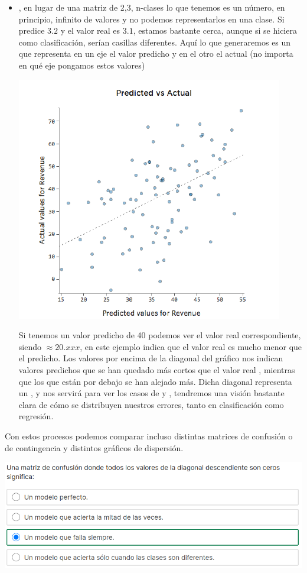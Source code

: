 \begin{itemize}
    \item {}, en lugar de una matriz de 2,3, n-clases lo que tenemos es un número, en principio, infinito de valores y no podemos representarlos en una clase. Si predice $3.2$ y el valor real es $3.1$,  estamos bastante cerca, aunque si se hiciera como clasificación, serían casillas diferentes. Aquí lo que generaremos es un  que representa en un eje el valor predicho y en el otro el actual (no importa en qué eje pongamos estos valores)
    \begin{center}
        \includegraphics[scale=.67]{images/mod02-10.png}
    \end{center}
    Si tenemos un valor predicho de 40 podemos ver el valor real correspondiente, siendo $\approx 20.xxx$, en este ejemplo indica que el valor real es mucho menor que el predicho. Los valores por encima de la diagonal del gráfico nos indican valores predichos que se han quedado más cortos que el valor real , mientras que los que están por debajo se han alejado más. Dicha diagonal representa un ,  y nos servirá para ver los casos de  y , tendremos una visión bastante clara de cómo se distribuyen nuestros errores, tanto en clasificación como regresión.
\end{itemize}

Con estos procesos podemos comparar incluso distintas matrices de confusión o de contingencia y distintos gráficos de dispersión.

\begin{center}
    \includegraphics[scale=.67]{images/mod02-11.png}
\end{center}

